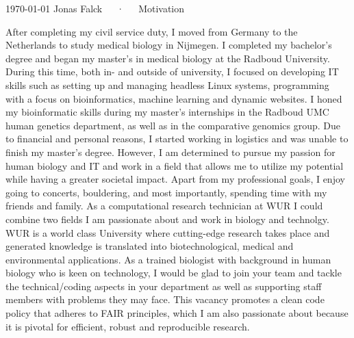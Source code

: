 \documentclass[11pt, a4paper]{awesome-cv}
\begin{document}
\makecvheader[R]

\makecvfooter
  {\today}
  {Jonas Falck~~~·~~~Motivation}
  {}

\makelettertitle

\begin{cvletter}

After completing my civil service duty, I moved from Germany to the Netherlands to study medical biology in Nijmegen. 
I completed my bachelor’s degree and began my master's in medical biology at the Radboud University. 
During this time, both in- and outside of university, I focused on developing IT skills such as setting up and managing headless Linux systems, programming with a focus on bioinformatics, machine learning and dynamic websites. 
I honed my bioinformatic skills during my master's internships in the Radboud UMC human genetics department, as well as in the comparative genomics group. 
Due to financial and personal reasons, I started working in logistics and was unable to finish my master’s degree. 
However, I am determined to pursue my passion for human biology and IT and work in a field that allows me to utilize my potential while having a greater societal impact.
Apart from my professional goals, I enjoy going to concerts, bouldering, and most importantly, spending time with my friends and family.
As a computational research technician at WUR I could combine two fields I am passionate about and work in biology and technolgy.
WUR is a world class University where cutting-edge research takes place and generated knowledge is translated into biotechnological, medical and environmental applications.
As a trained biologist with background in human biology who is keen on technology, I would be glad to join your team and tackle the technical/coding aspects in your department as well as supporting staff members with problems they may face.
This vacancy promotes a clean code policy that adheres to FAIR principles, which I am also passionate about because it is pivotal for efficient, robust and reproducible research.

\end{cvletter}
\end{document}
